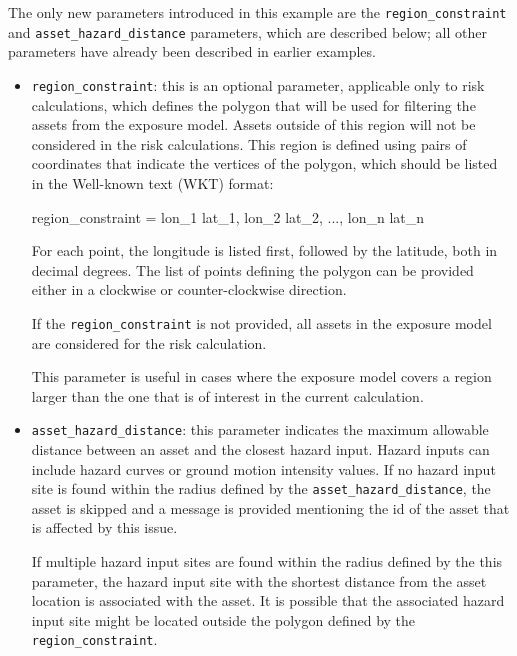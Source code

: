 The only new parameters introduced in this example are the
\Verb+region_constraint+ and \Verb+asset_hazard_distance+ parameters, which
are described below; all other parameters have already been described in
earlier examples.

\begin{itemize}

  \item \Verb+region_constraint+: this is an optional parameter, applicable
    only to risk calculations, which defines the polygon that will be used for
    filtering the assets from the exposure model. Assets outside of this region
    will not be considered in the risk calculations. This region is defined
    using pairs of coordinates that indicate the vertices of the polygon, which
    should be listed in the Well-known text (WKT) format:

    region\_constraint = lon\_1 lat\_1, lon\_2 lat\_2, ..., lon\_n lat\_n

    For each point, the longitude is listed first, followed by the latitude,
    both in decimal degrees. The list of points defining the polygon can be
    provided either in a clockwise or counter-clockwise direction.

    If the \Verb+region_constraint+ is not provided, all assets in the exposure
    model are considered for the risk calculation.

    This parameter is useful in cases where the exposure model covers a region
    larger than the one that is of interest in the current calculation.

  \item \Verb+asset_hazard_distance+: this parameter indicates the maximum
    allowable distance between an \gls{asset} and the closest hazard input.
    Hazard inputs can include hazard curves or ground motion intensity values.
    If no hazard input site is found within the radius defined by the
    \Verb+asset_hazard_distance+, the asset is skipped and a message is
    provided mentioning the id of the asset that is affected by this issue.

    If multiple hazard input sites are found within the radius defined by the
    this parameter, the hazard input site with the shortest distance from the
    asset location is associated with the asset. It is possible that the
    associated hazard input site might be located outside the polygon defined
    by the \Verb+region_constraint+.

\end{itemize}

